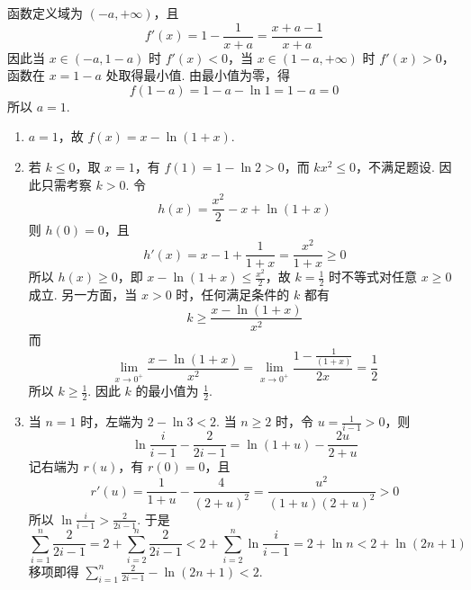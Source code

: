 \begin{solution}
函数定义域为 \((-a,+\infty)\)，且
\[
f'(x)=1-\frac1{x+a}=\frac{x+a-1}{x+a}
\]
因此当 \(x\in(-a,1-a)\) 时 \(f'(x)<0\)，当 \(x\in(1-a,+\infty)\) 时 \(f'(x)>0\)，函数在 \(x=1-a\) 处取得最小值. 由最小值为零，得
\[
f(1-a)=1-a-\ln1=1-a=0
\]
所以 \(a=1\).
\begin{enumerate}
\item \(a=1\)，故 \(f(x)=x-\ln(1+x)\).
\item 若 \(k\leqslant0\)，取 \(x=1\)，有 \(f(1)=1-\ln2>0\)，而 \(kx^2\leqslant0\)，不满足题设. 因此只需考察 \(k>0\). 令
\[
h(x)=\frac{x^2}{2}-x+\ln(1+x)
\]
则 \(h(0)=0\)，且
\[
h'(x)=x-1+\frac1{1+x}=\frac{x^2}{1+x}\geqslant0
\]
所以 \(h(x)\geqslant0\)，即 \(x-\ln(1+x)\leqslant\frac{x^2}{2}\)，故 \(k=\frac12\) 时不等式对任意 \(x\geqslant0\) 成立. 另一方面，当 \(x>0\) 时，任何满足条件的 \(k\) 都有
\[
k\geqslant\frac{x-\ln(1+x)}{x^2}
\]
而
\[
\lim_{x\to0^+}\frac{x-\ln(1+x)}{x^2}=\lim_{x\to0^+}\frac{1-\frac{1}{(1+x)}}{2x}=\frac12
\]
所以 \(k\geqslant\frac12\). 因此 \(k\) 的最小值为 \(\frac12\).
\item 当 \(n=1\) 时，左端为 \(2-\ln3<2\). 当 \(n\geqslant2\) 时，令 \(u=\frac1{i-1}>0\)，则
\[
\ln\frac{i}{i-1}-\frac2{2i-1}=\ln(1+u)-\frac{2u}{2+u}
\]
记右端为 \(r(u)\)，有 \(r(0)=0\)，且
\[
r'(u)=\frac1{1+u}-\frac4{(2+u)^2}=\frac{u^2}{(1+u)(2+u)^2}>0
\]
所以 \(\ln\frac{i}{i-1}>\frac2{2i-1}\). 于是
\[
\sum_{i=1}^{n}\frac2{2i-1}=2+\sum_{i=2}^{n}\frac2{2i-1}<2+\sum_{i=2}^{n}\ln\frac{i}{i-1}=2+\ln n<2+\ln(2n+1)
\]
移项即得 \(\displaystyle\sum_{i=1}^{n}\frac2{2i-1}-\ln(2n+1)<2\).
\end{enumerate}
\end{solution}
